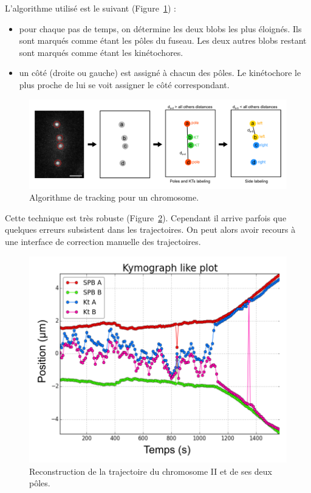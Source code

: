 \documentclass[12pt,a4paper,twoside,openright]{book}
\begin{document}
L'algorithme utilisé est le suivant (Figure~\ref{fig:algo_cen2}) :

\begin{itemize}
\item
  pour chaque pas de temps, on détermine les deux blobs les plus
  éloignés. Ils sont marqués comme étant les pôles du fuseau. Les deux
  autres blobs restant sont marqués comme étant les kinétochores.
\item
  un côté (droite ou gauche) est assigné à chacun des pôles. Le
  kinétochore le plus proche de lui se voit assigner le côté
  correspondant.
\end{itemize}

\begin{figure}[htbp]
\centering
\includegraphics{figures/results/imaging/algo_cen2.png}
\caption[Algorithme de tracking pour un chromosome]{\label{fig:algo_cen2}Algorithme
de tracking pour un chromosome.}
\end{figure}

Cette technique est très robuste (Figure~\ref{fig:cen2}). Cependant il
arrive parfois que quelques erreurs subsistent dans les trajectoires. On
peut alors avoir recours à une interface de correction manuelle des
trajectoires.

\begin{figure}[htbp]
\centering
\includegraphics{figures/results/imaging/cen2.png}
\caption[Reconstruction de la trajectoire du chromosome II et de ces deux pôles.]{\label{fig:cen2}Reconstruction
de la trajectoire du chromosome II et de ses deux pôles.}
\end{figure}
\end{document}

